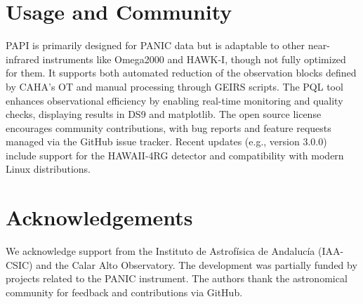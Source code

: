 \documentclass[10pt]{article}
\begin{document}
\section*{Usage and Community}

PAPI is primarily designed for PANIC data but is adaptable to other near-infrared instruments like Omega2000 and HAWK-I, though not fully optimized for them. It supports both automated reduction of the observation blocks defined by CAHA’s OT and manual processing through GEIRS scripts. The PQL tool enhances observational efficiency by enabling real-time monitoring and quality checks, displaying results in DS9 and matplotlib. The open source license encourages community contributions, with bug reports and feature requests managed via the GitHub issue tracker. Recent updates (e.g., version 3.0.0) include support for the HAWAII-4RG detector and compatibility with modern Linux distributions. \cite{papi_docs}

\section*{Acknowledgements}

We acknowledge support from the Instituto de Astrofísica de Andalucía (IAA-CSIC) and the Calar Alto Observatory. The development was partially funded by projects related to the PANIC instrument. The authors thank the astronomical community for feedback and contributions via GitHub.



\end{document}
